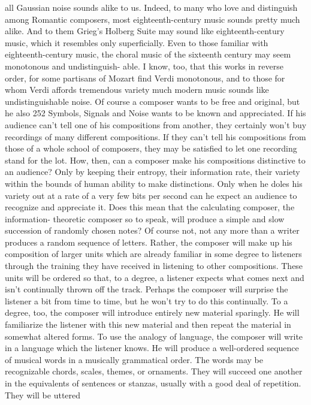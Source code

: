 {{{{{{{{{{{{all Gaussian noise sounds alike to us.
Indeed, to many who love and distinguish among Romantic
composers, most eighteenth-century music sounds pretty much
alike. And to them Grieg’s Holberg Suite may sound like eighteenth-century
music, which it resembles only superficially. Even
to those familiar with eighteenth-century music, the choral music
of the sixteenth century may seem monotonous and undistinguish-
able. I know, too, that this works in reverse order, for some
partisans of Mozart find Verdi monotonous, and to those for whom
Verdi affords tremendous variety much modern music sounds like
undistinguishable noise.
Of course a composer wants to be free and original, but he also
252
Symbols,
Signals and Noise
wants to be known and appreciated. If his audience can’t tell one
of his compositions from another, they certainly won’t buy recordings
of many different compositions. If they can’t tell his compositions
from those of a whole school of composers, they may be
satisfied to let one recording stand for the lot.
How, then, can a composer make his compositions distinctive
to an audience? Only by keeping their entropy, their information
rate, their variety within the bounds of human ability to make
distinctions. Only when he doles his variety out at a rate of a very
few bits per second can he expect an audience to recognize and
appreciate it.
Does this mean that the calculating composer, the information-
theoretic composer so to speak, will produce a simple and slow
succession of randomly chosen notes? Of course not, not any more
than a writer produces a random sequence of letters. Rather, the
composer will make up his composition of larger units which are
already familiar in some degree to listeners through the training
they have received in listening to other compositions. These units
will be ordered so that, to a degree, a listener expects what comes
next and isn’t continually thrown off the track. Perhaps the composer
will surprise the listener a bit from time to time, but he
won’t try to do this continually. To a degree, too, the composer
will introduce entirely new material sparingly. He will familiarize
the listener with this new material and then repeat the material in
somewhat altered forms.
To use the analogy of language, the composer will write in a
language which the listener knows. He will produce a well-ordered
sequence of musical words in a musically grammatical order. The
words may be recognizable chords, scales, themes, or ornaments.
They will succeed one another in the equivalents of sentences or
stanzas, usually with a good deal of repetition. They will be uttered
}}}}}}}}}}}}
